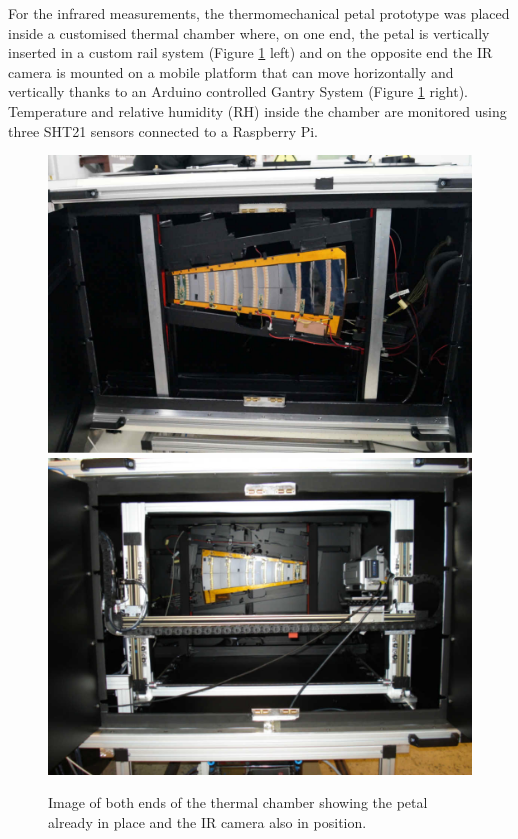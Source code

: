 		For the infrared measurements, the thermomechanical petal prototype was placed inside a customised thermal chamber where, on one end, the petal is vertically inserted in a custom rail system (Figure \ref{fig2.3} left) and on the opposite end the IR camera is mounted on a mobile platform that can move horizontally and vertically thanks to an Arduino controlled Gantry System (Figure \ref{fig2.3} right). Temperature and relative humidity (RH) inside the chamber are monitored using three SHT21 sensors connected  to a Raspberry Pi. 
		
		\begin{figure}[ht!]
			\centering
			\captionsetup{justification=centering,margin=2cm}
			\includegraphics[scale=0.25]{Figures/Chapter02/ChamberBack.jpg}
			\includegraphics[scale=0.26]{Figures/Chapter02/CamberFront.jpg}
			\caption{Image of both ends of the thermal chamber showing the petal already in place and the IR camera also in position.}\label{fig2.3}
		\end{figure}
		
